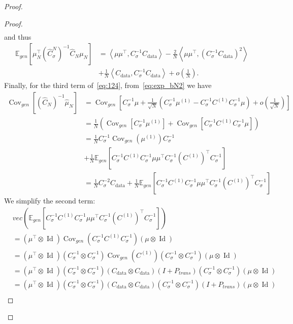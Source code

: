 \documentclass[11pt]{article}
\newcommand{\id}{\operatorname{Id}}
\newcommand{\EE}{\mathbb{E}}
\newcommand{\cov}{\operatorname{Cov}}
\begin{document}
\begin{proof}
\begin{proof}
\begin{align*}
\end{align*}
and thus 
\begin{align*}
\mathbb{E}_{gen} \left[ \mu_N^\top  (\hat C^N_\sigma)^{-1} \hat C_N  \mu_N \right] &=   \left\langle  \mu\mu^\top, C_\sigma^{-1} C_\mathrm{data} \right\rangle - \frac2N \left\langle  \mu\mu^\top, (C_\sigma^{-1} C_\mathrm{data})^2 \right\rangle \\
&+ \nonumber \frac1N \left\langle C_\mathrm{data}, C_\sigma^{-1} C_\mathrm{data} \right\rangle + o \left( \frac{1}{N}\right) .
\end{align*}
Finally, for the third term of~\eqref{eq:124}, from~\eqref{eq:exp_bN2} we have 
\begin{align}
\cov_{gen}[(\hat C_N)^{-1} \hat \mu_N] &= \cov_{gen}\left[C_\sigma^{-1} \mu + \frac{1}{\sqrt{N}} (C_\sigma^{-1} \mu^{(1)} - C_\sigma^{-1} C^{(1)} C_\sigma^{-1} \mu) + o\left(\frac{1}{\sqrt{N}}\right)   \right] \\
&= \frac1N \left( \cov_{gen}[C_\sigma^{-1} \mu^{(1)}] + \cov_{gen}[C_\sigma^{-1} C^{(1)} C_\sigma^{-1} \mu] \right) \\
&=  \frac1N C_\sigma^{-1} \cov_{gen}(\mu^{(1)}) C_\sigma^{-1}  \\
&+ \nonumber \frac1N   \EE_{gen}\left[ C_\sigma^{-1} C^{(1)} C_\sigma^{-1} \mu \mu^\top C_\sigma^{-1} (C^{(1)})^\top C_\sigma^{-1}\right]  \\
&=  \frac1N C_\sigma^{-2} C_\mathrm{data}  + \frac1N \EE_{gen}\left[ C_\sigma^{-1} C^{(1)} C_\sigma^{-1} \mu \mu^\top C_\sigma^{-1} (C^{(1)})^\top C_\sigma^{-1}\right] \label{eq:141}
\end{align}
We simplify the second term:
\begin{align*}
& vec\left( \EE_{gen}\left[ C_\sigma^{-1} C^{(1)} C_\sigma^{-1} \mu \mu^\top C_\sigma^{-1} (C^{(1)})^\top C_\sigma^{-1}\right] \right) \\
&= (\mu^\top \otimes \id) \cov_{gen}(C_\sigma^{-1} C^{(1)} C_\sigma^{-1})  (\mu \otimes \id)  \\
&=  (\mu^\top \otimes \id)  (C_\sigma^{-1} \otimes C_\sigma^{-1})  \cov_{gen}(C^{(1)}) (C_\sigma^{-1} \otimes C_\sigma^{-1}) (\mu \otimes \id) \\
&=  (\mu^\top \otimes \id)  (C_\sigma^{-1} \otimes C_\sigma^{-1})  (C_\mathrm{data} \otimes C_\mathrm{data})  ( I + P_{trans})   (C_\sigma^{-1} \otimes C_\sigma^{-1})  (\mu\otimes \id) \\
&=  (\mu^\top \otimes \id)  (C_\sigma^{-1} \otimes C_\sigma^{-1})  (C_\mathrm{data} \otimes C_\mathrm{data})  (C_\sigma^{-1} \otimes C_\sigma^{-1}) ( I + P_{trans})  (\mu\otimes \id) \\

\end{align*}
\end{proof}
\end{proof}
\end{document}
